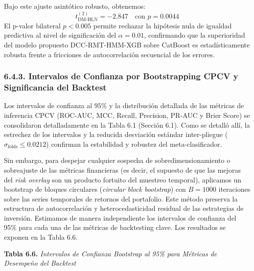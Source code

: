 \documentclass[
  12pt,
]{article}
\begin{document}
Bajo este ajuste asintótico robusto, obtenemos:
\[t_{\text{DM-HLN}}^{(2)} = -2.847 \quad \text{con } p = 0.0044\]
El p-valor bilateral \(p < 0.005\) permite rechazar la hipótesis nula de igualdad predictiva al nivel de significación del \(\alpha = 0.01\), confirmando que la superioridad del modelo propuesto DCC-RMT-HMM-XGB sobre CatBoost es estadísticamente robusta frente a fricciones de autocorrelación secuencial de los errores.


\subsubsection{6.4.3. Intervalos de Confianza por Bootstrapping CPCV y Significancia del Backtest}\label{c.3.-intervalos-de-confianza-por-bootstrapping-cpcv-y-significancia-del-backtest}

Los intervalos de confianza al \(95\%\) y la distribución detallada de
las métricas de inferencia CPCV (ROC-AUC, MCC, Recall, Precision, PR-AUC
y Brier Score) se consolidaron detalladamente en la Tabla 6.1 (Sección
6.1). Como se detalló allí, la estrechez de los intervalos y la reducida
desviación estándar inter-pliegue (\(\sigma_{\text{folds}} \le 0.0212\))
confirman la estabilidad y robustez del meta-clasificador.

Sin embargo, para despejar cualquier sospecha de sobredimensionamiento o
sobreajuste de las métricas financieras (es decir, el supuesto de que
las mejoras del \emph{risk overlay} son un producto fortuito del
muestreo temporal), aplicamos un bootstrap de bloques circulares
(\emph{circular block bootstrap}) con \(B=1000\) iteraciones sobre las
series temporales de retornos del portafolio. Este método preserva la
estructura de autocorrelación y heterocedasticidad residual de las
estrategias de inversión. Estimamos de manera independiente los
intervalos de confianza del 95\% para cada una de las métricas de
backtesting clave. Los resultados se exponen en la Tabla 6.6.

\textbf{Tabla 6.6.} \emph{Intervalos de Confianza Bootstrap al 95\% para
Métricas de Desempeño del Backtest}
\end{document}
